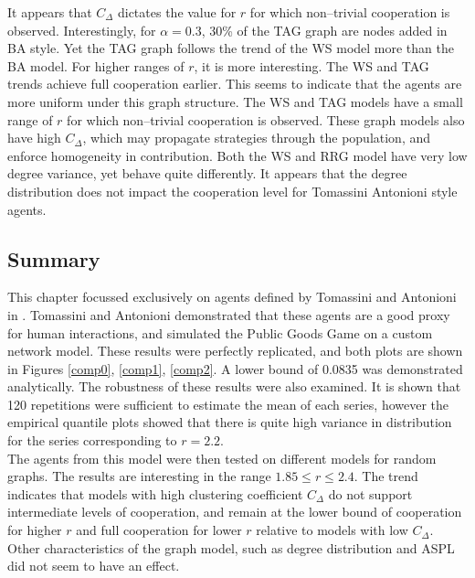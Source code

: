 It appears that $C_\Delta$ dictates the value for $r$ for which non--trivial cooperation is observed. Interestingly, for $\alpha = 0.3$, 30\% of the TAG graph are nodes added in BA style. Yet the TAG graph follows the trend of the WS model more than the BA model.
\FloatBarrier
{}
\FloatBarrier
For higher ranges of $r$, it is more interesting. The WS and TAG trends achieve full cooperation earlier. This seems to indicate that the agents are more uniform under this graph structure. The WS and TAG models have a small range of $r$ for which non--trivial cooperation is observed. These graph models also have high $C_\Delta$, which may propagate strategies through the population, and enforce homogeneity in contribution. Both the WS and RRG model have very low degree variance, yet behave quite differently. It appears that the degree distribution does not impact the cooperation level for Tomassini Antonioni style agents. \\

\subsection{Summary}

This chapter focussed exclusively on agents defined by Tomassini and Antonioni in \cite{RN49}. Tomassini and Antonioni demonstrated that these agents are a good proxy for human interactions, and simulated the Public Goods Game on a custom network model. These results were perfectly replicated, and both plots are shown in Figures \ref{comp0}, \ref{comp1}, \ref{comp2}.  A lower bound of 0.0835 was demonstrated analytically. The robustness of these results were also examined. It is shown that 120 repetitions were sufficient to estimate the mean of each series, however the empirical quantile plots showed that there is quite high variance in distribution for the series corresponding to $r=2.2$.\\ 

The agents from this model were then tested on different models for random graphs. The results are interesting in the range $1.85\leq r \leq 2.4$. The trend indicates that models with high clustering coefficient $C_\Delta$ do not support intermediate levels of cooperation, and remain at the lower bound of cooperation for higher $r$ and full cooperation for lower $r$ relative to models with low $C_\Delta$. Other characteristics of the graph model, such as degree distribution and ASPL did not seem to have an effect. \\



